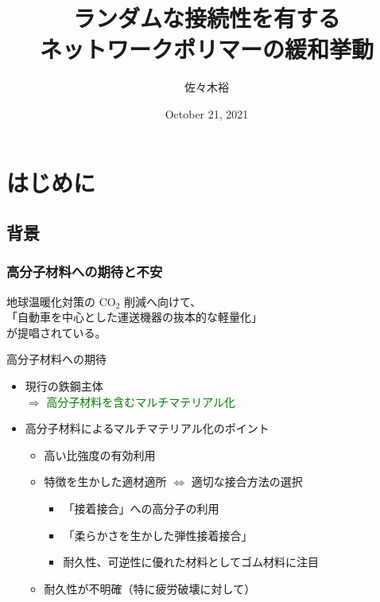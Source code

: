 \documentclass[12pt, dvipdfmx]{beamer}
\title
[ランダムな接続性を有するネットワークポリマーの緩和挙動]
{ランダムな接続性を有する\\ネットワークポリマーの緩和挙動}
\author[東亞合成　佐々木]{佐々木裕}
\institute[東亞合成]{東亞合成}
\date{October 21, 2021}
\begin{document}
\begin{frame}\frametitle{}
	\titlepage
\end{frame}

\section{はじめに}
\subsection{背景}

\begin{frame}
	\frametitle{高分子材料への期待と不安}
	地球温暖化対策の CO$_2$ 削減へ向けて、\\
	{\color{red}「自動車を中心とした運送機器の抜本的な軽量化」}
	\\
	が提唱されている。
	\begin{block}{高分子材料への期待}
		\begin{itemize}
			\item 現行の鉄鋼主体\\$ \Rightarrow$ \textcolor{green}{高分子材料を含むマルチマテリアル化}
			\item 高分子材料によるマルチマテリアル化のポイント
				\begin{itemize}
					\item \alert{高い比強度}の有効利用
					\item 特徴を生かした適材適所 $\Leftrightarrow$ 適切な接合方法の選択
						\begin{itemize}
							\item {\color{red} 「接着接合」への高分子の利用}
							\item {\color{red} 「柔らかさを生かした弾性接着接合」}
							\item 耐久性、可逆性に優れた材料として\alert{ゴム材料に注目}
						\end{itemize}
					\item {\color{blue}耐久性が不明確（特に疲労破壊に対して）}
				\end{itemize}
		\end{itemize}
	\end{block}
\end{frame}
\end{document}
